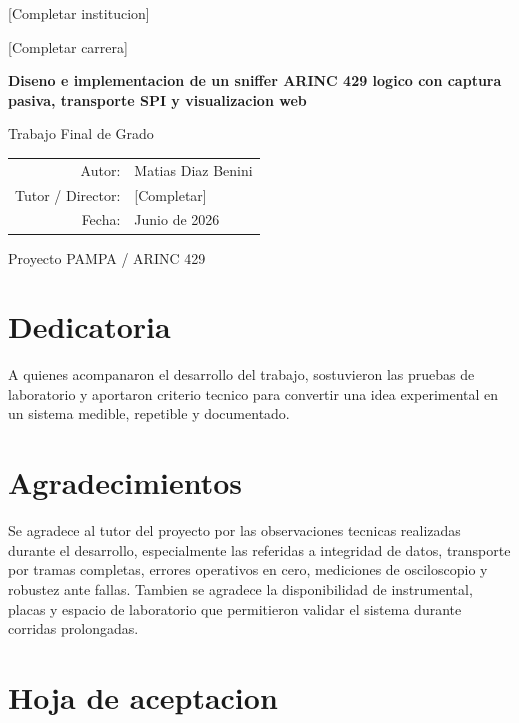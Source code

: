 \documentclass[12pt,a4paper,oneside]{report}
\newcommand{\titulo}{Diseno e implementacion de un sniffer ARINC 429 logico con captura pasiva, transporte SPI y visualizacion web}
\newcommand{\autor}{Matias Diaz Benini}
\newcommand{\director}{[Completar]}
\newcommand{\institucion}{[Completar institucion]}
\newcommand{\carrera}{[Completar carrera]}
\newcommand{\fechaentrega}{Junio de 2026}
\begin{document}
\begin{titlepage}
  \centering
  \vspace*{1.5cm}
  {\Large \institucion\par}
  \vspace{0.4cm}
  {\large \carrera\par}
  \vspace{2.0cm}
  {\Huge\bfseries \titulo\par}
  \vspace{2.0cm}
  {\Large Trabajo Final de Grado\par}
  \vspace{1.5cm}
  \begin{tabular}{rl}
    Autor: & \autor \\
    Tutor / Director: & \director \\
    Fecha: & \fechaentrega \\
  \end{tabular}
  \vfill
  {\large Proyecto PAMPA / ARINC 429\par}
\end{titlepage}


\chapter*{Dedicatoria}

A quienes acompanaron el desarrollo del trabajo, sostuvieron las pruebas de
laboratorio y aportaron criterio tecnico para convertir una idea experimental
en un sistema medible, repetible y documentado.

\chapter*{Agradecimientos}

Se agradece al tutor del proyecto por las observaciones tecnicas realizadas
durante el desarrollo, especialmente las referidas a integridad de datos,
transporte por tramas completas, errores operativos en cero, mediciones de
osciloscopio y robustez ante fallas. Tambien se agradece la disponibilidad de
instrumental, placas y espacio de laboratorio que permitieron validar el
sistema durante corridas prolongadas.

\chapter*{Hoja de aceptacion}
\end{document}
